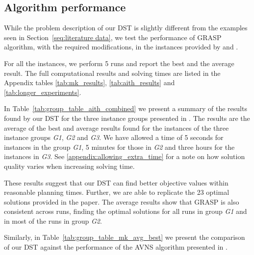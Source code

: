 \documentclass[a4paper,11pt]{elsarticle}
\begin{document}
\subsection{Algorithm performance}\label{seq:algorithm_performance}

While the problem description of our DST is slightly different from the examples seen in Section~\ref{seq:literature data}, we test the performance of GRASP algorithm, with the required modifications, in the instances provided by \cite{AitHaddadene2016} and \cite{Mankowska2014}.

For all the instances, we perform 5 runs and report the best and the average result. The full computational results and solving times are listed in the Appendix tables \ref{tab:mk_results}, \ref{tab:aith_results} and \ref{tab:longer_experiments}. 

In Table~\ref{tab:group_table_aith_combined} we present a summary of the results found by our DST for the three instance groups presented in \cite{AitHaddadene2016}. The results are the average of the best and average results found for the instances of the three instance groups \emph{G1}, \emph{G2} and \emph{G3}. We have allowed a time of 5 seconds for instances in the group \emph{G1}, 5 minutes for those in \emph{G2} and three hours for the instances in \emph{G3}. See \ref{appendix:allowing_extra_time} for a note on how solution quality varies when increasing solving time.



These results suggest that our DST can find better objective values within reasonable planning times. Further, we are able to replicate the 23 optimal solutions provided in the paper. The average results show that GRASP is also consistent across runs, finding the optimal solutions for all runs in group \emph{G1} and in most of the runs in group \emph{G2}.

Similarly, in Table~\ref{tab:group_table_mk_avg_best} we present the comparison of our DST against the performance of the AVNS algorithm presented in \cite{Mankowska2014}.
\end{document}

